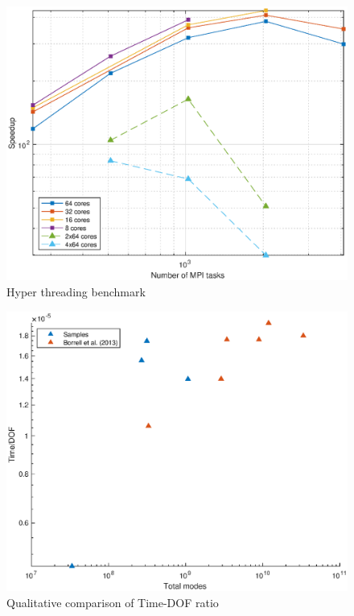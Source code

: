 \begin{figure}
\begin{center}
\includegraphics[scale=0.55]{grafici/hyperthreading}
\caption{Hyper threading benchmark}
\label{hyper}
\end{center}
\end{figure}

\begin{figure}
\begin{center}
\includegraphics[scale=0.55]{grafici/time_dof}
\caption{Qualitative comparison of Time-DOF ratio}
\label{time:dof}
\end{center}
\end{figure}
